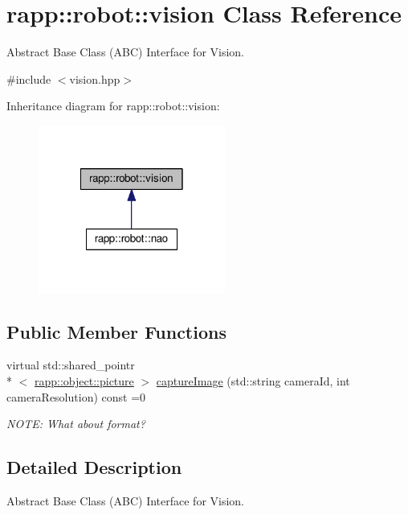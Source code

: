 \hypertarget{classrapp_1_1robot_1_1vision}{\section{rapp\-:\-:robot\-:\-:vision Class Reference}
\label{classrapp_1_1robot_1_1vision}
}


Abstract Base Class (A\-B\-C) Interface for Vision.  




{\ttfamily \#include $<$vision.\-hpp$>$}



Inheritance diagram for rapp\-:\-:robot\-:\-:vision\-:
\nopagebreak
\begin{figure}[H]
\begin{center}
\leavevmode
\includegraphics[width=174pt]{classrapp_1_1robot_1_1vision__inherit__graph}
\end{center}
\end{figure}
\subsection*{Public Member Functions}
\begin{DoxyCompactItemize}
\item 
virtual std\-::shared\-\_\-pointr\\*
$<$ \hyperlink{classrapp_1_1object_1_1picture}{rapp\-::object\-::picture} $>$ \hyperlink{classrapp_1_1robot_1_1vision_ac6f224f2da0d9512b8c6700de3eded85}{capture\-Image} (std\-::string camera\-Id, int camera\-Resolution) const =0
\begin{DoxyCompactList}\small\item\em N\-O\-T\-E\-: What about format? \end{DoxyCompactList}\end{DoxyCompactItemize}


\subsection{Detailed Description}
Abstract Base Class (A\-B\-C) Interface for Vision. 

